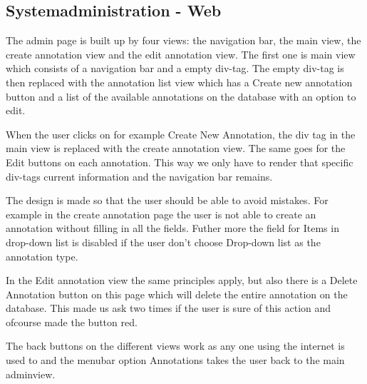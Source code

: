 \subsection{Systemadministration - Web}
The admin page is built up by four views: the navigation bar, the main view, the create annotation view and the edit annotation view. The first one is main view which consists of a navigation bar and a empty div-tag. 
The empty div-tag is then replaced with the annotation list view which has a Create new annotation button 
and a list of the available annotations on the database with an option to edit. 

When the user clicks on for example Create New Annotation, the div tag in the main view is replaced with the create annotation view.
The same goes for the Edit buttons on each annotation. This way we only have to render that specific div-tags current information 
and the navigation bar remains. 

The design is made so that the user should be able to avoid mistakes. For example in the 
create annotation page the user is not able to create an annotation without filling in all the fields. Futher more the 
field for Items in drop-down list is disabled if the user don't choose Drop-down list as the annotation type. 

In the Edit annotation view the same principles apply, but also there is a Delete Annotation button on this page which will
delete the entire annotation on the database. This made us ask two times if the user is sure of this action and ofcourse made the button red.

The back buttons on the different views work as any one using the internet is used to and the menubar option Annotations takes the user back to the main adminview.